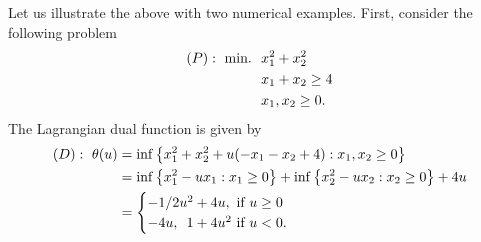 Let us illustrate the above with two numerical examples. First, consider the following problem
%
\begin{align*}
	(P):~ \mathop{\text{min.~}} \ & x_1^2 + x_2^2 \\
	& x_1 + x_2 \geq 4 \\
	& x_1, x_2 \geq 0.
\end{align*}
%
The Lagrangian dual function is given by 
%
\begin{align*} 
	(D):~\theta(u) & = \inf \left\{ x_1^2 + x_2^2 + u(-x_1 -x_2 + 4) : x_1, x_2 \geq 0 \right \} \\
	& = \inf \left\{ x_1^2 - ux_1 : x_1 \geq 0 \right \} + \inf \left\{ x_2^2 - ux_2 : x_2 \geq 0 \right \} + 4u \\
	& = \begin{cases}
	     -1/2u^2 + 4u, \text{ if } u \geq 0 \\
	     -4u, ~\, 1 + 4u^2 \text{ if } u < 0. 
	 \end{cases}
\end{align*}

